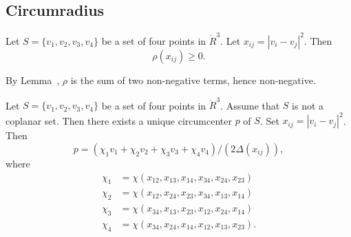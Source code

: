 \begin{tarskidata}
\begin{tarski}
\section{Circumradius}

\begin{lemma}
Let $S=\{v_1,v_2,v_3,v_4\}$ be
a set of four points in $\ring{R}^3$.  Let
$x_{ij}=|v_i-v_j|^2$.  Then
	$$\rho(x_{ij})\ge 0.$$
\end{lemma}

\begin{proved} By Lemma~,
$\rho$ is the sum of two non-negative terms, hence
non-negative.
\swallowed\end{proved}
\end{tarski}





\begin{tarski}

\begin{lemma}
Let $S=\{v_1,v_2,v_3,v_4\}$ be a set of four points in $\ring{R}^3$.
Assume that $S$ is not a coplanar set.  
Then there exists a unique circumcenter $p$
of $S$.  Set $x_{ij} = |v_i-v_j|^2$.
Then 
    $$
    p = (\chi_1 v_1 + \chi_2 v_2 + \chi_3 v_3 + \chi_4
    v_4)/(2\Delta(x_{ij})),
    $$
where
    $$
    \begin{array}{lll}
    \chi_1 &= \chi(x_{12},x_{13},x_{14},x_{34},x_{24},x_{23})\\
    \chi_2 &= \chi(x_{12},x_{24},x_{23},x_{34},x_{13},x_{14})\\
    \chi_3 &= \chi(x_{34},x_{13},x_{23},x_{12},x_{24},x_{14})\\
    \chi_4 &= \chi(x_{34},x_{24},x_{14},x_{12},x_{13},x_{23}).
    \end{array}
    $$
\end{lemma}



\end{tarski}
\end{tarskidata}
